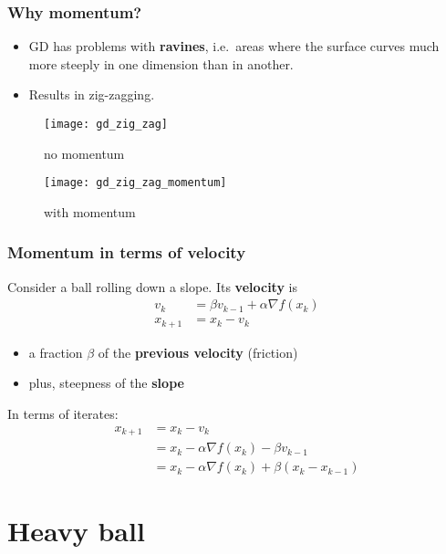 \documentclass[aspectratio=149]{beamer}
\begin{document}
\begin{frame}
  \frametitle{Why momentum?}
  \begin{itemize}
    \item GD has problems with \textbf{ravines}, i.e.\ areas where the surface curves much more steeply in one dimension than in another.
    \item Results in zig-zagging.
  \end{itemize}

  \begin{minipage}{0.48\textwidth}
    \begin{figure}[ht]
      \centering
      \texttt{[image: gd\_zig\_zag]}
      \caption{no momentum}
    \end{figure}
  \end{minipage}
  \begin{minipage}{0.48\textwidth}
    \begin{figure}[ht]
      \centering
      \texttt{[image: gd\_zig\_zag\_momentum]}
      \caption{with momentum}
    \end{figure}
  \end{minipage}
\end{frame}

\begin{frame}
  \frametitle{Momentum in terms of velocity}
  Consider a ball rolling down a slope. Its \textbf{velocity} is
  \begin{align}
    v_k &= \beta v_{k-1} + \alpha \nabla f(x_k) \\
    x_{k+1} &= x_k - v_k
  \end{align}
  \begin{itemize}
    \item a fraction $\beta$ of the \textbf{previous velocity} (friction)
    \item plus, steepness of the \textbf{slope}
  \end{itemize}
  In terms of iterates:
  \begin{align}
    x_{k+1} &= x_k - v_k \\
            &= x_k - \alpha \nabla f(x_k) - \beta v_{k-1} \\
            &= x_k - \alpha \nabla f(x_k) + \beta (x_k - x_{k-1})
  \end{align}
\end{frame}


\section{Heavy ball}%
\label{sec:}
\end{document}
